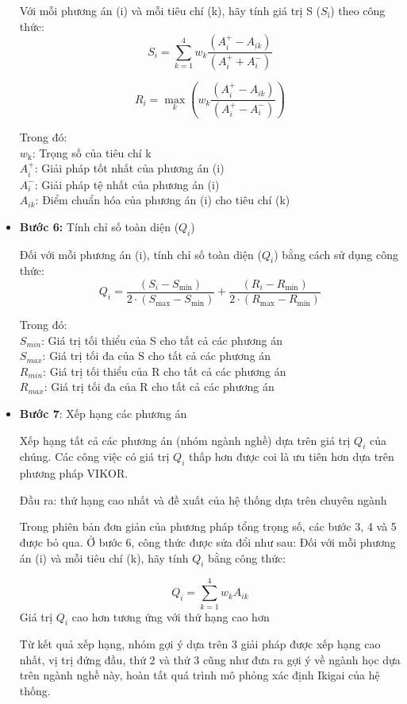 \begin{itemize}
    Với mỗi phương án (i) và mỗi tiêu chí (k), hãy tính giá trị S ($S_{\text{i}}$) theo công thức:\\
    \[
S_i = \sum_{k=1}^{4} w_k \frac{{(A^{+}_i - A_{ik})}}{{(A^{+}_i + A^{-}_i)}}
\]

    \[
R_i = \max_{k} \left( w_k \frac{{(A^{+}_i - A_{ik})}}{{(A^{+}_i - A^{-}_i)}} \right)
\]

    Trong đó:\\
    $w_{\text{k}}$: Trọng số của tiêu chí k\\
    $A^{+}_i$: Giải pháp tốt nhất của phương án (i)\\
    $A^{-}_i$: Giải pháp tệ nhất của phương án (i)\\
    $A_{ik}$: Điểm chuẩn hóa của phương án (i) cho tiêu chí (k)

    \item \textbf{Bước 6:} Tính chỉ số toàn diện ($Q_{i}$)
    
    Đối với mỗi phương án (i), tính chỉ số toàn diện ($Q_{i}$) bằng cách sử dụng công thức:
    \[
        Q_i = \frac{{(S_i - S_{\text{min}})}}{{2 \cdot (S_{\text{max}} - S_{\text{min}})}} + \frac{{(R_i - R_{\text{min}})}}{{2 \cdot (R_{\text{max}} - R_{\text{min}})}}
    \]

    Trong đó: \\
    $S_{min}$: Giá trị tối thiểu của S cho tất cả các phương án \\
    $S_{max}$: Giá trị tối đa của S cho tất cả các phương án \\
    $R_{min}$: Giá trị tối thiểu của R cho tất cả các phương án \\
    $R_{max}$: Giá trị tối đa của R cho tất cả các phương án \\

    \item \textbf{Bước 7}: Xếp hạng các phương án

    Xếp hạng tất cả các phương án (nhóm ngành nghề) dựa trên giá trị $Q_i$ của chúng. Các công việc có giá trị $Q_i$ thấp hơn được coi là ưu tiên hơn dựa trên phương pháp VIKOR.
    
    Đầu ra: thứ hạng cao nhất và đề xuất của hệ thống dựa trên chuyên ngành
    
    Trong phiên bản đơn giản của phương pháp tổng trọng số, các bước 3, 4 và 5 được bỏ qua. Ở bước 6, công thức được sửa đổi như sau:
    Đối với mỗi phương án (i) và mỗi tiêu chí (k), hãy tính $Q_i$ bằng công thức:
    
    \[
Q_i = \sum_{k=1}^{4} w_k A_{ik}
\]
    Giá trị $Q_i$ cao hơn tương ứng với thứ hạng cao hơn
    
    Từ kết quả xếp hạng, nhóm gợi ý dựa trên 3 giải pháp được xếp hạng cao nhất, vị trị đứng đầu, thứ 2 và thứ 3 cũng như đưa ra gợi ý về ngành học dựa trên ngành nghề này, hoàn tất quá trình mô phỏng xác định Ikigai của hệ thống.
\end{itemize}


